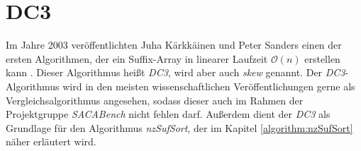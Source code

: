 \section{DC3}
\label{algorithm:dc3}

Im  Jahre 2003 veröffentlichten Juha Kärkkäinen und Peter Sanders einen der ersten Algorithmen, der ein Suffix-Array in linearer Laufzeit $\mathcal{O}(n)$ erstellen kann \cite{saca:9}. Dieser Algorithmus heißt \emph{DC3}, wird aber auch \emph{skew} genannt. Der \emph{DC3}-Algorithmus wird in den meisten wissenschaftlichen Veröffentlichungen gerne als Vergleichsalgorithmus angesehen, sodass dieser auch im Rahmen der Projektgruppe \emph{SACABench} nicht fehlen darf. Außerdem dient der \emph{DC3} als Grundlage für den Algorithmus \emph{nzSufSort}, der im Kapitel \ref{algorithm:nzSufSort} näher erläutert wird.








